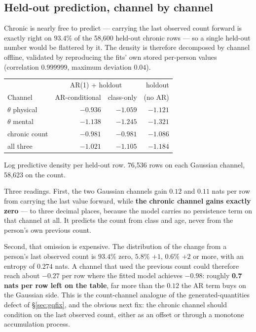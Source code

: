 \documentclass[11pt]{article}
\begin{document}
\subsection*{Held-out prediction, channel by channel}

Chronic is nearly free to predict --- carrying the last observed count
forward is exactly right on $93.4\%$ of the 58{,}600 held-out chronic rows
--- so a single held-out number would be flattered by it. The density is
therefore decomposed by channel offline, validated by reproducing the fits'
own stored per-person values (correlation $0.999999$, maximum deviation
$0.04$).

\begin{center}\small
\begin{tabular}{lrrr}
\toprule
 & \multicolumn{2}{c}{AR(1) + holdout} & holdout \\
Channel & AR-conditional & class-only & (no AR) \\
\midrule
$\theta$ physical & $-0.936$ & $-1.059$ & $-1.121$ \\
$\theta$ mental & $-1.138$ & $-1.245$ & $-1.321$ \\
chronic count & $-0.981$ & $-0.981$ & $-1.086$ \\
\midrule
all three & $-1.021$ & $-1.105$ & $-1.184$ \\
\bottomrule
\end{tabular}

{\scriptsize Log predictive density per held-out row. 76{,}536 rows on each
Gaussian channel, 58{,}623 on the count.}
\end{center}

Three readings. First, the two Gaussian channels gain $0.12$ and $0.11$ nats
per row from carrying the last value forward, while \textbf{the chronic
channel gains exactly zero} --- to three decimal places, because the model
carries no persistence term on that channel at all. It predicts the count
from class and age, never from the person's own previous count.

Second, that omission is expensive. The distribution of the change from a
person's last observed count is $93.4\%$ zero, $5.8\%$ $+1$, $0.6\%$ $+2$ or
more, with an entropy of $0.274$ nats. A channel that used the previous count
could therefore reach about $-0.27$ per row where the fitted model achieves
$-0.98$: roughly \textbf{0.7 nats per row left on the table}, far more than
the $0.12$ the AR term buys on the Gaussian side. This is the count-channel
analogue of the generated-quantities defect of \S\ref{sec:gqfix}, and the
obvious next fix: the chronic channel should condition on the last observed
count, either as an offset or through a monotone accumulation process.
\end{document}
